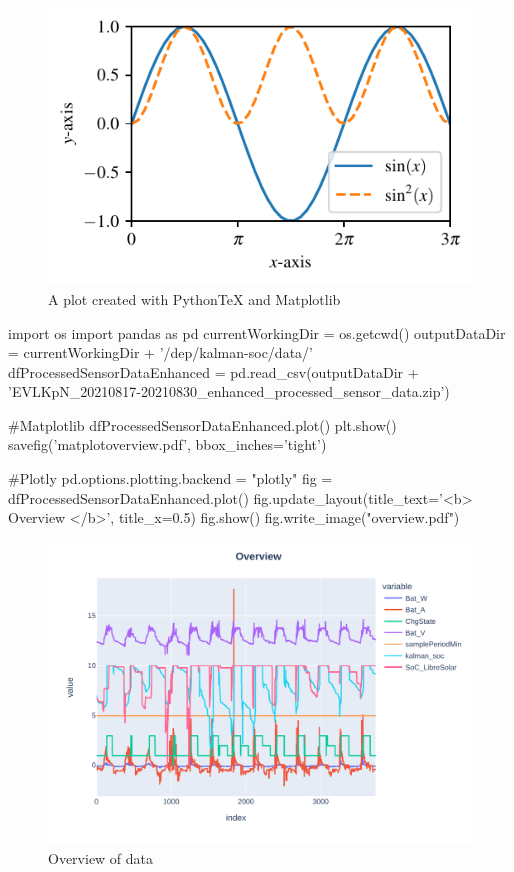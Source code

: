 \begin{figure}[!ht]
\includegraphics{myplot}
\caption{\label{fig:matplotlib} A plot created with PythonTeX and Matplotlib}
\end{figure}

\begin{pylabcode}
import os 
import pandas as pd
currentWorkingDir =  os.getcwd()
outputDataDir = currentWorkingDir + '/dep/kalman-soc/data/'
dfProcessedSensorDataEnhanced = pd.read_csv(outputDataDir + 'EVLKpN_20210817-20210830_enhanced_processed_sensor_data.zip')  

#Matplotlib
dfProcessedSensorDataEnhanced.plot()
plt.show()
savefig('matplotoverview.pdf', bbox_inches='tight')

#Plotly
pd.options.plotting.backend = "plotly"
fig = dfProcessedSensorDataEnhanced.plot()
fig.update_layout(title_text='<b> Overview  </b>', title_x=0.5)
fig.show()
fig.write_image("overview.pdf")
\end{pylabcode}
	
\begin{figure}[!ht]
\includegraphics{overview}
\caption{\label{fig:overview} Overview of data}
\end{figure}

